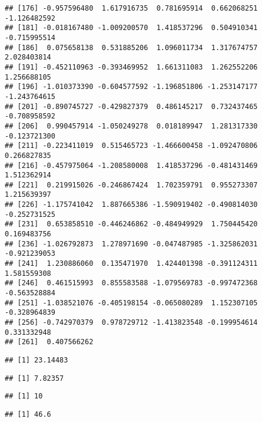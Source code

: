 \documentclass[
]{article}
\newenvironment{Shaded}{\begin{snugshade}}{\end{snugshade}}
\newcommand{\FunctionTok}[1]{\textcolor[rgb]{0.13,0.29,0.53}{\textbf{#1}}}
\newcommand{\NormalTok}[1]{#1}
\newcommand{\SpecialCharTok}[1]{\textcolor[rgb]{0.81,0.36,0.00}{\textbf{#1}}}
\begin{document}
\begin{verbatim}
## [176] -0.957596480  1.617916735  0.781695914  0.662068251 -1.126482592
## [181] -0.018167480 -1.009200570  1.418537296  0.504910341 -0.715995514
## [186]  0.075658138  0.531885206  1.096011734  1.317674757  2.028403814
## [191] -0.452110963 -0.393469952  1.661311083  1.262552206  1.256688105
## [196] -1.010373390 -0.604577592 -1.196851806 -1.253147177 -1.243764615
## [201] -0.890745727 -0.429827379  0.486145217  0.732437465 -0.708958592
## [206]  0.990457914 -1.050249278  0.018189947  1.281317330 -0.123721300
## [211] -0.223411019  0.515465723 -1.466600458 -1.092470806  0.266827835
## [216] -0.457975064 -1.208580008  1.418537296 -0.481431469  1.512362914
## [221]  0.219915026 -0.246867424  1.702359791  0.955273307  1.215639397
## [226] -1.175741042  1.887665386 -1.590919402 -0.490814030 -0.252731525
## [231]  0.653858510 -0.446246862 -0.484949929  1.750445420  0.169483756
## [236] -1.026792873  1.278971690 -0.047487985 -1.325862031 -0.921239053
## [241]  1.230886060  0.135471970  1.424401398 -0.391124311  1.581559308
## [246]  0.461515993  0.855583588 -1.079569783 -0.997472368 -0.563528884
## [251] -1.038521076 -0.405198154 -0.065080289  1.152307105 -0.328964839
## [256] -0.742970379  0.978729712 -1.413823548 -0.199954614  0.331332948
## [261]  0.407566262
\end{verbatim}

\begin{Shaded}
\end{Shaded}

\begin{verbatim}
## [1] 23.14483
\end{verbatim}

\begin{Shaded}
\end{Shaded}

\begin{verbatim}
## [1] 7.82357
\end{verbatim}

\begin{Shaded}
\end{Shaded}

\begin{verbatim}
## [1] 10
\end{verbatim}

\begin{Shaded}
\end{Shaded}

\begin{verbatim}
## [1] 46.6
\end{verbatim}
\end{document}
